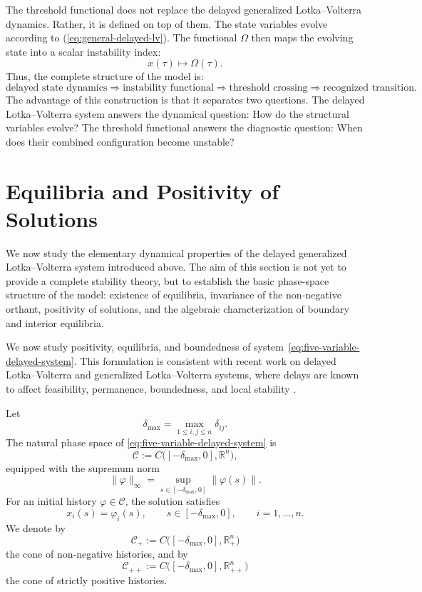 \documentclass[11pt]{article}
\def\eq#1{(\ref{#1})}
\begin{document}
The threshold functional does not replace the delayed generalized Lotka--Volterra dynamics. Rather, it is defined on top of them. The state variables evolve according to  \eq{eq:general-delayed-lv}.
The functional $\Omega$ then maps the evolving state into a scalar instability index:
\[
x(\tau)
\longmapsto
\Omega(\tau).
\]
Thus, the complete structure of the model is:
\[
\text{delayed state dynamics} 
\Rightarrow 
\text{instability functional} 
\Rightarrow
\text{threshold crossing} 
\Rightarrow
\text{recognized transition}.
\]
The advantage of this construction is that it separates two questions. The delayed Lotka--Volterra system answers the dynamical question:
 How do the structural variables evolve? 
 The threshold functional answers the diagnostic question:
 When does their combined configuration become unstable? 
 





 





\section{Equilibria and Positivity of Solutions}
\label{sec:equilibria-positivity}

We now study the elementary dynamical properties of the delayed generalized
Lotka--Volterra system introduced above. The aim of this section is not yet to
provide a complete stability theory, but to establish the basic phase-space
structure of the model: existence of equilibria, invariance of the non-negative
orthant, positivity of solutions, and the algebraic characterization of boundary
and interior equilibria.

We now study positivity, equilibria, and boundedness of system~\eqref{eq:five-variable-delayed-system}. This formulation is consistent with recent work on
delayed Lotka--Volterra and generalized Lotka--Volterra systems, where delays
are known to affect feasibility, permanence, boundedness, and local stability
\cite{saeedian2022delay,pigani2022delay,xu2022delayedlv,JiangHalikMuhammadhaji2023NSpeciesDelays}.

Let
\[
\delta_{\max}=\max_{1\leq i,j\leq n}\delta_{ij}.
\]
The natural phase space of \eqref{eq:five-variable-delayed-system} is
\[
\mathcal{C}:=
C\big([-\delta_{\max},0],\mathbb{R}^{n}\big),
\]
equipped with the supremum norm
\[
\|\varphi\|_{\infty}
=
\sup_{s\in[-\delta_{\max},0]}\|\varphi(s)\|.
\]
For an initial history \(\varphi\in\mathcal{C}\), the solution satisfies
\[
x_i(s)=\varphi_i(s),
\qquad s\in[-\delta_{\max},0],
\qquad i=1,\ldots,n.
\]
We denote by
\[
\mathcal{C}_{+}:=
C\big([-\delta_{\max},0],\mathbb{R}^{n}_{+}\big)
\]
the cone of non-negative histories, and by
\[
\mathcal{C}_{++}:=
C\big([-\delta_{\max},0],\mathbb{R}^{n}_{++}\big)
\]
the cone of strictly positive histories.
\end{document}
